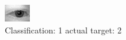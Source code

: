 \begin{figure}[h!]
\begin{center}
\includegraphics[width=0.60\columnwidth]{figures/ID372_class_1_target_2.png}
\end{center}
\caption{ Classification: 1 actual target: 2}
\label{fig:ID372_class_1_target_2}
\end{figure}
